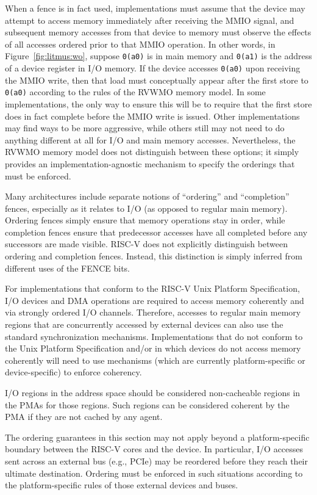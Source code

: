 When a fence is in fact used, implementations must assume that the device may attempt to access memory immediately after receiving the MMIO signal, and subsequent memory accesses from that device to memory must observe the effects of all accesses ordered prior to that MMIO operation.
In other words, in Figure~\ref{fig:litmus:wo}, suppose {\tt 0(a0)} is in main memory and {\tt 0(a1)} is the address of a device register in I/O memory.
If the device accesses {\tt 0(a0)} upon receiving the MMIO write, then that load must conceptually appear after the first store to {\tt 0(a0)} according to the rules of the RVWMO memory model.
In some implementations, the only way to ensure this will be to require that the first store does in fact complete before the MMIO write is issued.
Other implementations may find ways to be more aggressive, while others still may not need to do anything different at all for I/O and main memory accesses.
Nevertheless, the RVWMO memory model does not distinguish between these options; it simply provides an implementation-agnostic mechanism to specify the orderings that must be enforced.

Many architectures include separate notions of ``ordering'' and ``completion'' fences, especially as it relates to I/O (as opposed to regular main memory).
Ordering fences simply ensure that memory operations stay in order, while completion fences ensure that predecessor accesses have all completed before any successors are made visible.
RISC-V does not explicitly distinguish between ordering and completion fences.
Instead, this distinction is simply inferred from different uses of the FENCE bits.

For implementations that conform to the RISC-V Unix Platform Specification, I/O devices and DMA operations are required to access memory coherently and via strongly ordered I/O channels.
Therefore, accesses to regular main memory regions that are concurrently accessed by external devices can also use the standard synchronization mechanisms.
Implementations that do not conform to the Unix Platform Specification and/or in which devices do not access memory coherently will need to use mechanisms (which are currently platform-specific or device-specific) to enforce coherency.

I/O regions in the address space should be considered non-cacheable regions in the PMAs for those regions.  Such regions can be considered coherent by the PMA if they are not cached by any agent.

The ordering guarantees in this section may not apply beyond a platform-specific boundary between the RISC-V cores and the device.  In particular, I/O accesses sent across an external bus (e.g., PCIe) may be reordered before they reach their ultimate destination.  Ordering must be enforced in such situations according to the platform-specific rules of those external devices and buses.

